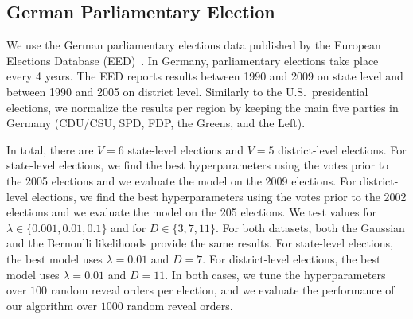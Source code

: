 \subsection{German Parliamentary Election}%
\label{app:ge}

We use the German parliamentary elections data published by the European Elections Database (EED)~\cite{norsk2020germany}.
In Germany, parliamentary elections take place every 4 years.
The EED reports results between 1990 and 2009 on state level and between 1990 and 2005 on district level.
Similarly to the U.S.\ presidential elections, we normalize the results per region by keeping the main five parties in Germany (CDU/CSU, SPD, FDP, the Greens, and the Left).

In total, there are $V=6$ state-level elections and $V=5$ district-level elections.
For state-level elections, we find the best hyperparameters using the votes prior to the 2005 elections and we evaluate the model on the 2009 elections.
For district-level elections, we find the best hyperparameters using the votes prior to the 2002 elections and we evaluate the model on the 205 elections.
We test values for $\lambda \in \{0.001, 0.01, 0.1 \}$ and for $D \in \{3, 7, 11\}$.
For both datasets, both the Gaussian and the Bernoulli likelihoods provide the same results.
For state-level elections, the best model uses $\lambda=0.01$ and $D=7$.
For district-level elections, the best model uses $\lambda=0.01$ and $D=11$.
In both cases, we tune the hyperparameters over $100$ random reveal orders per election, and we evaluate the performance of our algorithm over $1000$ random reveal orders.
